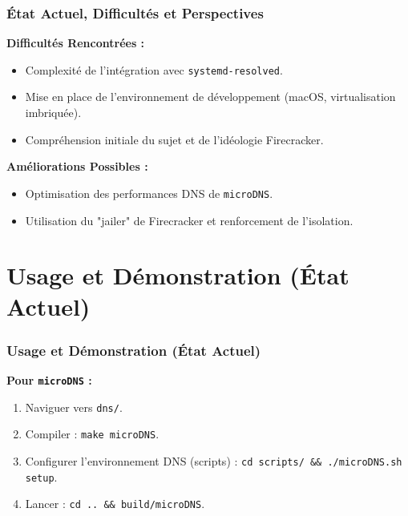 \documentclass[12pt]{beamer}
\begin{document}
	\begin{frame}
		\frametitle{État Actuel, Difficultés et Perspectives}
		\textbf{Difficultés Rencontrées :}
		\begin{itemize}
			\item Complexité de l'intégration avec \texttt{systemd-resolved}.
			\item Mise en place de l'environnement de développement (macOS, virtualisation imbriquée).
			\item Compréhension initiale du sujet et de l'idéologie Firecracker.
		\end{itemize}
		\vspace{0.5em}
		\textbf{Améliorations Possibles :}
		\begin{itemize}
			\item Optimisation des performances DNS de \texttt{microDNS}.
			\item Utilisation du "jailer" de Firecracker et renforcement de l'isolation.
		\end{itemize}
	\end{frame}

    \section{Usage et Démonstration (État Actuel)}
	\begin{frame}
		\frametitle{Usage et Démonstration (État Actuel)}
		\textbf{Pour \texttt{microDNS} :}
		\begin{enumerate}
			\item Naviguer vers \texttt{dns/}.
			\item Compiler : \texttt{make microDNS}.
			\item Configurer l'environnement DNS (scripts) : \texttt{cd scripts/ \&\& ./microDNS.sh setup}.
			\item Lancer : \texttt{cd .. \&\& build/microDNS}.
		\end{enumerate}
	\end{frame}
\end{document}

